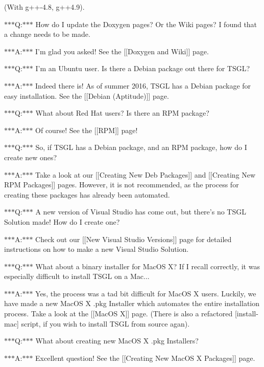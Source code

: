 (With g++-\/4.8, g++4.9).

$\ast$$\ast$$\ast$\-Q\-:$\ast$$\ast$$\ast$ How do I update the Doxygen pages? Or the Wiki pages? I found that a change needs to be made.

$\ast$$\ast$$\ast$\-A\-:$\ast$$\ast$$\ast$ I'm glad you asked! See the \mbox{[}\mbox{[}Doxygen and Wiki\mbox{]}\mbox{]} page.

$\ast$$\ast$$\ast$\-Q\-:$\ast$$\ast$$\ast$ I'm an Ubuntu user. Is there a Debian package out there for T\-S\-G\-L?

$\ast$$\ast$$\ast$\-A\-:$\ast$$\ast$$\ast$ Indeed there is! As of summer 2016, T\-S\-G\-L has a Debian package for easy installation. See the \mbox{[}\mbox{[}Debian (Aptitude)\mbox{]}\mbox{]} page.

$\ast$$\ast$$\ast$\-Q\-:$\ast$$\ast$$\ast$ What about Red Hat users? Is there an R\-P\-M package?

$\ast$$\ast$$\ast$\-A\-:$\ast$$\ast$$\ast$ Of course! See the \mbox{[}\mbox{[}R\-P\-M\mbox{]}\mbox{]} page!

$\ast$$\ast$$\ast$\-Q\-:$\ast$$\ast$$\ast$ So, if T\-S\-G\-L has a Debian package, and an R\-P\-M package, how do I create new ones?

$\ast$$\ast$$\ast$\-A\-:$\ast$$\ast$$\ast$ Take a look at our \mbox{[}\mbox{[}Creating New Deb Packages\mbox{]}\mbox{]} and \mbox{[}\mbox{[}Creating New R\-P\-M Packages\mbox{]}\mbox{]} pages. However, it is not recommended, as the process for creating these packages has already been automated.

$\ast$$\ast$$\ast$\-Q\-:$\ast$$\ast$$\ast$ A new version of Visual Studio has come out, but there's no T\-S\-G\-L Solution made! How do I create one?

$\ast$$\ast$$\ast$\-A\-:$\ast$$\ast$$\ast$ Check out our \mbox{[}\mbox{[}New Visual Studio Versions\mbox{]}\mbox{]} page for detailed instructions on how to make a new Visual Studio Solution.

$\ast$$\ast$$\ast$\-Q\-:$\ast$$\ast$$\ast$ What about a binary installer for Mac\-O\-S X? If I recall correctly, it was especially difficult to install T\-S\-G\-L on a Mac...

$\ast$$\ast$$\ast$\-A\-:$\ast$$\ast$$\ast$ Yes, the process was a tad bit difficult for Mac\-O\-S X users. Luckily, we have made a new Mac\-O\-S X .pkg Installer which automates the entire installation process. Take a look at the \mbox{[}\mbox{[}Mac\-O\-S X\mbox{]}\mbox{]} page. (There is also a refactored \mbox{[}install-\/mac\mbox{]} script, if you wish to install T\-S\-G\-L from source agan).

$\ast$$\ast$$\ast$\-Q\-:$\ast$$\ast$$\ast$ What about creating new Mac\-O\-S X .pkg Installers?

$\ast$$\ast$$\ast$\-A\-:$\ast$$\ast$$\ast$ Excellent question! See the \mbox{[}\mbox{[}Creating New Mac\-O\-S X Packages\mbox{]}\mbox{]} page. 